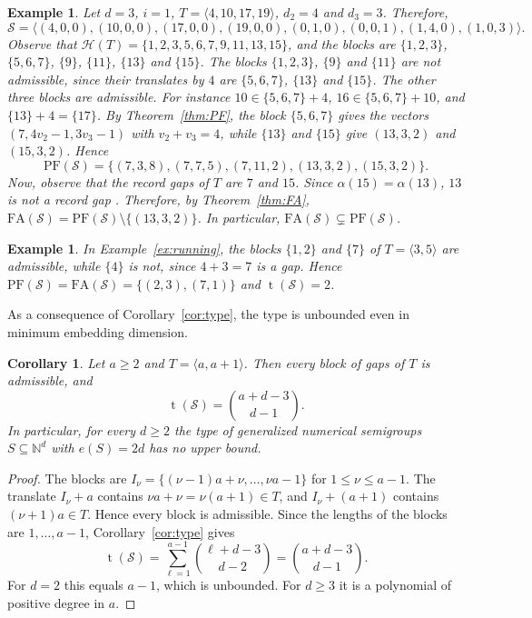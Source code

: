 \documentclass[12pt]{amsart}
\theoremstyle{plain}
\theoremstyle{theorem}
\newtheorem{corollary}[definition]{Corollary}
\newtheorem{example}[definition]{Example}
\theoremstyle{remark}
\begin{document}
\begin{example}\label{ex:FA-neq-PF}
Let $d=3$, $i=1$, $T=\langle4,10,17,19\rangle$, $d_2=4$ and $d_3=3$. Therefore,
$$\mathcal{S}=\langle(4,0,0),(10,0,0),(17,0,0),(19,0,0),(0,1,0),(0,0,1),(1,4,0),(1,0,3)\rangle.$$
Observe that $\mathcal{H}(T) = \{1,2,3,5,6,7,9,11,13,15\}$, and the blocks are $\{1,2,3\}$, $\{5,6,7\}$, $\{9\}$, $\{11\}$, $\{13\}$ and $\{15\}$. The blocks $\{1,2,3\}$, $\{9\}$ and $\{11\}$ are not admissible, since their translates by $4$ are $\{5,6,7\}$, $\{13\}$ and $\{15\}$. The other three blocks are admissible. For instance $10 \in \{5,6,7\}+4$, $16 \in \{5,6,7\}+10$, and $\{13\}+4=\{17\}$. By Theorem~\ref{thm:PF}, the block $\{5,6,7\}$ gives the vectors $(7,4v_2-1,3v_3-1)$ with $v_2+v_3=4$, while $\{13\}$ and $\{15\}$ give $(13,3,2)$ and $(15,3,2)$. Hence
$$
\mathrm{PF}(\mathcal{S})=\{(7,3,8),(7,7,5),(7,11,2),(13,3,2),(15,3,2)\}.$$
Now, observe that the record gaps of $T$ are $7$ and $15$. Since $\alpha(15)=\alpha(13)$, $13$ is not a record gap . Therefore, by Theorem~\ref{thm:FA}, $\mathrm{FA}(\mathcal{S})=\mathrm{PF}(\mathcal{S})\setminus\{(13,3,2)\}$. In particular, $\mathrm{FA}(\mathcal{S})\subsetneq\mathrm{PF}(\mathcal{S})$.
\end{example}

\begin{example}\label{ex:running-PF}
In Example~\ref{ex:running}, the blocks $\{1,2\}$ and $\{7\}$ of $T=\langle3,5\rangle$ are admissible, while $\{4\}$ is not, since $4+3=7$ is a gap. Hence $\mathrm{PF}(\mathcal{S})=\mathrm{FA}(\mathcal{S})=\{(2,3),(7,1)\}$ and $\operatorname{t}(\mathcal{S})=2$.
\end{example}

As a consequence of Corollary~\ref{cor:type}, the type is unbounded even in minimum embedding dimension.

\begin{corollary}\label{cor:unbounded}
Let $a\ge2$ and $T=\langle a,a+1\rangle$. Then every block of gaps of $T$ is admissible, and
$$\operatorname{t}(\mathcal{S}) =\binom{a+d-3}{d-1}.$$
In particular, for every $d\geq2$ the type of generalized numerical semigroups $S\subseteq\mathbb{N}^d$ with $e(S)=2d$ has no upper bound.
\end{corollary}

\begin{proof}
The blocks are $I_\nu=\{(\nu-1)a+\nu,\dots,\nu a-1\}$ for $1\le\nu\le a-1$. The translate $I_\nu+a$ contains $\nu a+\nu=\nu(a+1)\in T$, and $I_\nu+(a+1)$ contains $(\nu+1)a\in T$. Hence every block is admissible. Since the lengths of the blocks are $1,\dots,a-1$, Corollary~\ref{cor:type} gives
$$\operatorname{t}(\mathcal{S})=\sum_{\ell=1}^{a-1}\binom{\ell+d-3}{d-2}=\binom{a+d-3}{d-1}.$$
For $d=2$ this equals $a-1$, which is unbounded. For $d\ge3$ it is a polynomial of positive degree in $a$.
\end{proof}
\end{document}
